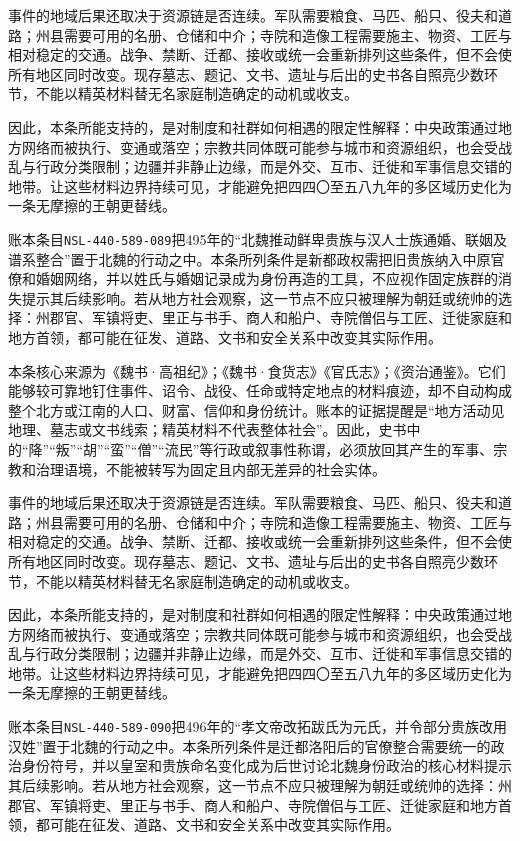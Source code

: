 事件的地域后果还取决于资源链是否连续。军队需要粮食、马匹、船只、役夫和道路；州县需要可用的名册、仓储和中介；寺院和造像工程需要施主、物资、工匠与相对稳定的交通。战争、禁断、迁都、接收或统一会重新排列这些条件，但不会使所有地区同时改变。现存墓志、题记、文书、遗址与后出的史书各自照亮少数环节，不能以精英材料替无名家庭制造确定的动机或收支。

因此，本条所能支持的，是对制度和社群如何相遇的限定性解释：中央政策通过地方网络而被执行、变通或落空；宗教共同体既可能参与城市和资源组织，也会受战乱与行政分类限制；边疆并非静止边缘，而是外交、互市、迁徙和军事信息交错的地带。让这些材料边界持续可见，才能避免把四四〇至五八九年的多区域历史化为一条无摩擦的王朝更替线。

账本条目\texttt{NSL-440-589-089}把495年的“北魏推动鲜卑贵族与汉人士族通婚、联姻及谱系整合”置于北魏的行动之中。本条所列条件是新都政权需把旧贵族纳入中原官僚和婚姻网络，并以姓氏与婚姻记录成为身份再造的工具，不应视作固定族群的消失提示其后续影响。若从地方社会观察，这一节点不应只被理解为朝廷或统帅的选择：州郡官、军镇将吏、里正与书手、商人和船户、寺院僧侣与工匠、迁徙家庭和地方首领，都可能在征发、道路、文书和安全关系中改变其实际作用。

本条核心来源为《魏书·高祖纪》；《魏书·食货志》《官氏志》；《资治通鉴》。它们能够较可靠地钉住事件、诏令、战役、任命或特定地点的材料痕迹，却不自动构成整个北方或江南的人口、财富、信仰和身份统计。账本的证据提醒是“地方活动见地理、墓志或文书线索；精英材料不代表整体社会”。因此，史书中的“降”“叛”“胡”“蛮”“僧”“流民”等行政或叙事性称谓，必须放回其产生的军事、宗教和治理语境，不能被转写为固定且内部无差异的社会实体。

事件的地域后果还取决于资源链是否连续。军队需要粮食、马匹、船只、役夫和道路；州县需要可用的名册、仓储和中介；寺院和造像工程需要施主、物资、工匠与相对稳定的交通。战争、禁断、迁都、接收或统一会重新排列这些条件，但不会使所有地区同时改变。现存墓志、题记、文书、遗址与后出的史书各自照亮少数环节，不能以精英材料替无名家庭制造确定的动机或收支。

因此，本条所能支持的，是对制度和社群如何相遇的限定性解释：中央政策通过地方网络而被执行、变通或落空；宗教共同体既可能参与城市和资源组织，也会受战乱与行政分类限制；边疆并非静止边缘，而是外交、互市、迁徙和军事信息交错的地带。让这些材料边界持续可见，才能避免把四四〇至五八九年的多区域历史化为一条无摩擦的王朝更替线。

账本条目\texttt{NSL-440-589-090}把496年的“孝文帝改拓跋氏为元氏，并令部分贵族改用汉姓”置于北魏的行动之中。本条所列条件是迁都洛阳后的官僚整合需要统一的政治身份符号，并以皇室和贵族命名变化成为后世讨论北魏身份政治的核心材料提示其后续影响。若从地方社会观察，这一节点不应只被理解为朝廷或统帅的选择：州郡官、军镇将吏、里正与书手、商人和船户、寺院僧侣与工匠、迁徙家庭和地方首领，都可能在征发、道路、文书和安全关系中改变其实际作用。


